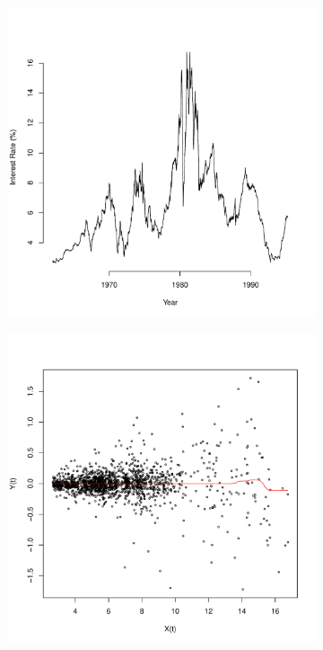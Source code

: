 \documentclass[12pt]{article}
\begin{document}
\begin{figure}
\centering
    \begin{subfigure}[b]{0.4\textwidth}
        \centering
        \includegraphics[width=\textwidth]{figures_treasury_a.pdf}
        \caption{}
        \label{fig:tb_raw_data}
    \end{subfigure}
    \hfill
    \begin{subfigure}[b]{0.4\textwidth}
        \centering
        \includegraphics[width=\textwidth]{figures_treasury_b.pdf}

\end{subfigure}
\end{figure}
\end{document}
